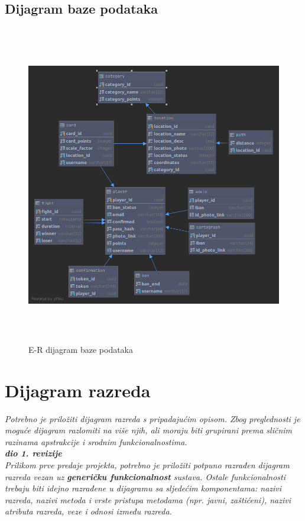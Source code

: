 			
			\subsection{Dijagram baze podataka}
				\begin{figure}[H]
					\includegraphics[width=\linewidth, height=14cm]{dijagrami/geofighterdb_diagram}				
					\centering
					\caption{E-R dijagram baze podataka}
					\label{}
				\end{figure}
			
			\eject
			
			
		\section{Dijagram razreda}
		
			\textit{Potrebno je priložiti dijagram razreda s pripadajućim opisom. Zbog preglednosti je moguće dijagram razlomiti na više njih, ali moraju biti grupirani prema sličnim razinama apstrakcije i srodnim funkcionalnostima.}\\
			
			\textbf{\textit{dio 1. revizije}}\\
			
			\textit{Prilikom prve predaje projekta, potrebno je priložiti potpuno razrađen dijagram razreda vezan uz \textbf{generičku funkcionalnost} sustava. Ostale funkcionalnosti trebaju biti idejno razrađene u dijagramu sa sljedećim komponentama: nazivi razreda, nazivi metoda i vrste pristupa metodama (npr. javni, zaštićeni), nazivi atributa razreda, veze i odnosi između razreda.}\\
			
